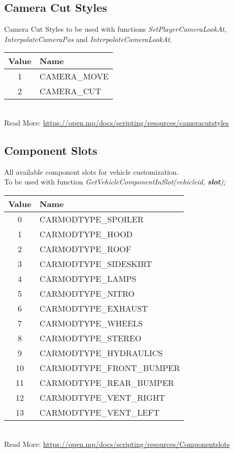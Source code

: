 \documentclass{article}
\begin{document}
\subsection{Camera Cut Styles}
Camera Cut Styles to be used with functions \textit{SetPlayerCameraLookAt}, \textit{InterpolateCameraPos} and \textit{InterpolateCameraLookAt}.
\bigskip
\\\begin{tabular}{ |c|l| } 
\hline
Value & Name \\
\hline
1 & CAMERA\_MOVE \\ 
2 & CAMERA\_CUT \\ 
\hline
\end{tabular}
\bigskip
\\Read More: \url{https://open.mp/docs/scripting/resources/cameracutstyles}


\subsection{Component Slots}
All available component slots for vehicle customization.\\To be used with function \textit{GetVehicleComponentInSlot(vehicleid, \textbf{slot});}
\bigskip
\\\begin{tabular}{ |c|l| } 
\hline
Value & Name \\
\hline
0 & CARMODTYPE\_SPOILER \\
1 & CARMODTYPE\_HOOD \\
2 & CARMODTYPE\_ROOF \\
3 & CARMODTYPE\_SIDESKIRT \\
4 & CARMODTYPE\_LAMPS \\
5 & CARMODTYPE\_NITRO \\
6 & CARMODTYPE\_EXHAUST \\
7 & CARMODTYPE\_WHEELS \\
8 & CARMODTYPE\_STEREO \\
9 & CARMODTYPE\_HYDRAULICS \\
10 & CARMODTYPE\_FRONT\_BUMPER \\
11 & CARMODTYPE\_REAR\_BUMPER \\
12 & CARMODTYPE\_VENT\_RIGHT \\
13 & CARMODTYPE\_VENT\_LEFT \\
\hline
\end{tabular}
\bigskip
\\Read More: \url{https://open.mp/docs/scripting/resources/Componentslots}
\end{document}
